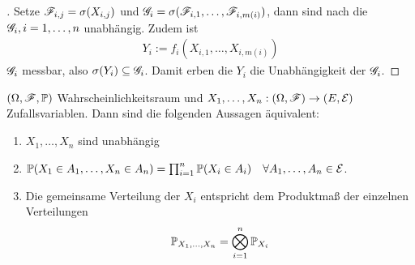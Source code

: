 \begin{proof}[]
	Setze $\F_{i,j} = \sigma(X_{i,j})$ und $\G_i = \sigma(\F_{i,1}, \dots, \F_{i,m(i)})$, dann sind nach  die $\G_i, i = 1,\dots,n$ unabhängig. Zudem ist
	\begin{align*}
	Y_i := f_i(X_{i,1}, \dots, X_{i,m(i)})
	\end{align*}
	$\G_i$ messbar, also $\sigma(Y_i) \subseteq \G_i$. Damit erben die $Y_i$ die Unabhängigkeit der $\G_i$.
\end{proof}
\begin{proposition}
	$(\O, \F, \P)$ Wahrscheinlichkeitsraum und $X_1, \dots, X_n: (\O,\F) \to (E, \Gen)$ Zufallsvariablen. Dann sind die folgenden Aussagen äquivalent:
	\begin{enumerate}
		\item $X_1, \dots, X_n$ sind unabhängig \label{prop:unabhZV1}
		\item $\P(X_1 \in A_1, \dots, X_n \in A_n) = \prod_{i=1}^n \P(X_i \in A_i)\quad \forall A_1, \dots, A_n \in \Gen$. \label{prop:unabhZV2}
		\item Die gemeinsame Verteilung der $X_i$ entspricht dem Produktmaß der einzelnen Verteilungen \label{prop:unabhZV3}
		\begin{align*}
			\P_{X_1, \dots, X_n} = \bigotimes_{i=1}^n \P_{X_i}
		\end{align*}
	\end{enumerate}
\end{proposition}
